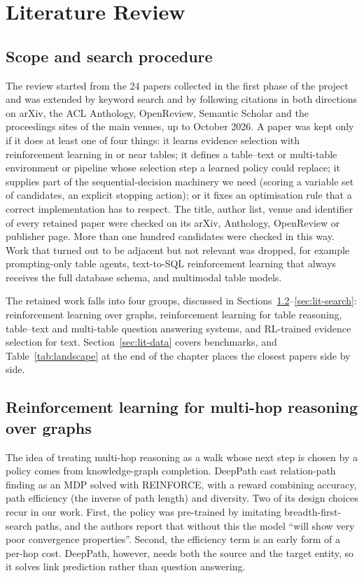 \chapter{Literature Review}
\label{ch:literature}

\section{Scope and search procedure}

The review started from the 24 papers collected in the first phase of the project and was extended by keyword search and by following citations in both directions on arXiv, the ACL Anthology, OpenReview, Semantic Scholar and the proceedings sites of the main venues, up to October 2026. A paper was kept only if it does at least one of four things: it learns evidence selection with reinforcement learning in or near tables; it defines a table--text or multi-table environment or pipeline whose selection step a learned policy could replace; it supplies part of the sequential-decision machinery we need (scoring a variable set of candidates, an explicit stopping action); or it fixes an optimisation rule that a correct implementation has to respect. The title, author list, venue and identifier of every retained paper were checked on its arXiv, Anthology, OpenReview or publisher page. More than one hundred candidates were checked in this way. Work that turned out to be adjacent but not relevant was dropped, for example prompting-only table agents, text-to-SQL reinforcement learning that always receives the full database schema, and multimodal table models.

The retained work falls into four groups, discussed in Sections~\ref{sec:lit-graph}--\ref{sec:lit-search}: reinforcement learning over graphs, reinforcement learning for table reasoning, table--text and multi-table question answering systems, and RL-trained evidence selection for text. Section~\ref{sec:lit-data} covers benchmarks, and Table~\ref{tab:landscape} at the end of the chapter places the closest papers side by side.

\section{Reinforcement learning for multi-hop reasoning over graphs}
\label{sec:lit-graph}

The idea of treating multi-hop reasoning as a walk whose next step is chosen by a policy comes from knowledge-graph completion. DeepPath \citep{xiong2017deeppath} cast relation-path finding as an MDP solved with REINFORCE, with a reward combining accuracy, path efficiency (the inverse of path length) and diversity. Two of its design choices recur in our work. First, the policy was pre-trained by imitating breadth-first-search paths, and the authors report that without this the model ``will show very poor convergence properties''. Second, the efficiency term is an early form of a per-hop cost. DeepPath, however, needs both the source and the target entity, so it solves link prediction rather than question answering.

